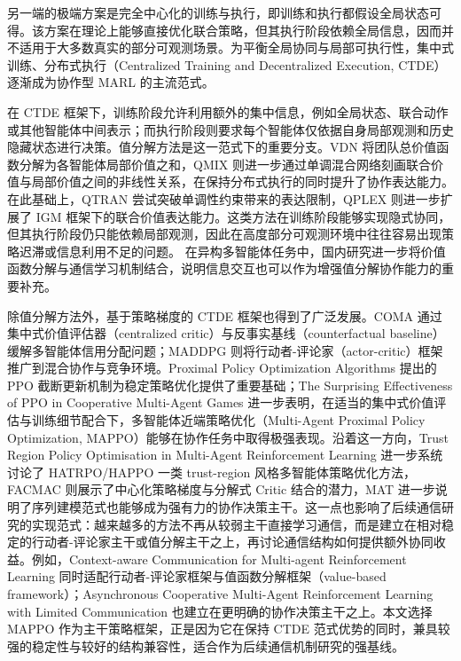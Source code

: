 另一端的极端方案是完全中心化的训练与执行，即训练和执行都假设全局状态可得。该方案在理论上能够直接优化联合策略，但其执行阶段依赖全局信息，因而并不适用于大多数真实的部分可观测场景。为平衡全局协同与局部可执行性，集中式训练、分布式执行（Centralized Training and Decentralized Execution, CTDE）逐渐成为协作型 MARL 的主流范式。

在 CTDE 框架下，训练阶段允许利用额外的集中信息，例如全局状态、联合动作或其他智能体中间表示；而执行阶段则要求每个智能体仅依据自身局部观测和历史隐藏状态进行决策。值分解方法是这一范式下的重要分支。VDN 将团队总价值函数分解为各智能体局部价值之和\cite{sunehag2018vdn}，QMIX 则进一步通过单调混合网络刻画联合价值与局部价值之间的非线性关系，在保持分布式执行的同时提升了协作表达能力\cite{rashid2018qmix}。在此基础上，QTRAN 尝试突破单调性约束带来的表达限制\cite{son2019qtran}，QPLEX 则进一步扩展了 IGM 框架下的联合价值表达能力\cite{wang2021qplex}。这类方法在训练阶段能够实现隐式协同，但其执行阶段仍只能依赖局部观测，因此在高度部分可观测环境中往往容易出现策略迟滞或信息利用不足的问题。
在异构多智能体任务中，国内研究进一步将价值函数分解与通信学习机制结合，说明信息交互也可以作为增强值分解协作能力的重要补充\cite{du2024heterocomm_cn}。

除值分解方法外，基于策略梯度的 CTDE 框架也得到了广泛发展。COMA 通过集中式价值评估器（centralized critic）与反事实基线（counterfactual baseline）缓解多智能体信用分配问题\cite{foerster2018coma}；MADDPG 则将行动者-评论家（actor-critic）框架推广到混合协作与竞争环境\cite{lowe2017maddpg}。Proximal Policy Optimization Algorithms 提出的 PPO 截断更新机制为稳定策略优化提供了重要基础\cite{schulman2017ppo}；The Surprising Effectiveness of PPO in Cooperative Multi-Agent Games 进一步表明，在适当的集中式价值评估与训练细节配合下，多智能体近端策略优化（Multi-Agent Proximal Policy Optimization, MAPPO）能够在协作任务中取得极强表现\cite{yu2021mappo}。沿着这一方向，Trust Region Policy Optimisation in Multi-Agent Reinforcement Learning 进一步系统讨论了 HATRPO/HAPPO 一类 trust-region 风格多智能体策略优化方法\cite{kuba2022happo}，FACMAC 则展示了中心化策略梯度与分解式 Critic 结合的潜力\cite{peng2021facmac}，MAT 进一步说明了序列建模范式也能够成为强有力的协作决策主干\cite{wen2022mat}。这一点也影响了后续通信研究的实现范式：越来越多的方法不再从较弱主干直接学习通信，而是建立在相对稳定的行动者-评论家主干或值分解主干之上，再讨论通信结构如何提供额外协同收益。例如，Context-aware Communication for Multi-agent Reinforcement Learning 同时适配行动者-评论家框架与值函数分解框架（value-based framework）\cite{li2024cacom}；Asynchronous Cooperative Multi-Agent Reinforcement Learning with Limited Communication 也建立在更明确的协作决策主干之上\cite{dolan2025asyncomarl}。本文选择 MAPPO 作为主干策略框架，正是因为它在保持 CTDE 范式优势的同时，兼具较强的稳定性与较好的结构兼容性，适合作为后续通信机制研究的强基线。

